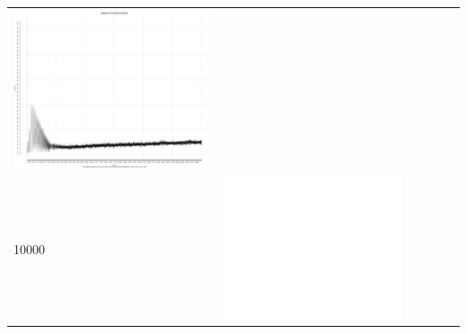 \begin{table}[htbp]
{\begin{tabular}{l | ccccc}
\begin{minipage}{.15\textwidth}
     			 	\includegraphics[width=\linewidth]{images/mema-triple/I13}
    				 \end{minipage}\\
		10000  &	 \begin{minipage}{.15\textwidth}\vspace{2pt}     							
     			 	\includegraphics[width=\linewidth]{images/mema-triple/I5}
    				 \end{minipage}
    			   &	 \begin{minipage}{.15\textwidth}\vspace{2pt}     							

\end{minipage}
\end{tabular}}
\end{table}
